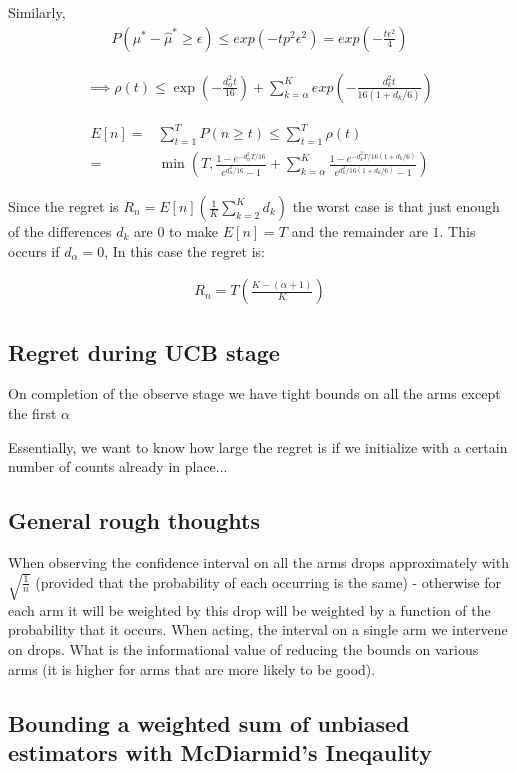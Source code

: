\documentclass{article}
\newcommand{\eqn}[1]{\begin{align}#1\end{align}}
\theoremstyle{plain}
\theoremstyle{definition}
\begin{document}
Similarly, 
\eqn {
P(\mu^* - \hat{\mu}^* \geq \epsilon) \leq exp(-tp^2\epsilon^2) = exp(-\frac{t\epsilon^2}{4})
}

\eqn {
\implies \rho(t) \leq \exp(-\frac{ d_\alpha^2 t}{16}) + \sum_{k=\alpha}^K exp(-\frac{d_k^2 t}{16(1+d_k/6)})
}


\eqn{ 
E[n] = & \sum_{t=1}^T P(n \geq t) \leq \sum_{t=1}^T \rho(t) \\
= & \min \left(T, \frac{1 - e^{-d_\alpha^2 T/16}}{e^{d_\alpha^2 /16} -1 } +  \sum_{k=\alpha}^K \frac{1 - e^{-d_k^2 T/16(1+d_k/6)}}{e^{d_k^2 /16(1+d_k/6)} -1 } \right)
}

Since the regret is $R_n = E[n]\left(\frac{1}{K}\sum_{k=2}^K d_k \right)$ the worst case is that just enough of the differences $d_k$ are $0$ to make $E[n] = T$ and the remainder are $1$. This occurs if $d_\alpha = 0$, In this case the regret is:

\eqn {
R_n = T \left(\frac{K-(\alpha+1)}{K}\right)
}


\subsection{Regret during UCB stage}

On completion of the observe stage we have tight bounds on all the arms except the first $\alpha$

Essentially, we want to know how large the regret is if we initialize with a certain number of counts already in place...


\subsection{General rough thoughts}

When observing the confidence interval on all the arms drops approximately with $\sqrt{\frac{1}{n}}$ (provided that the probability of each occurring is the same) - otherwise for each arm it will be weighted by this drop will be weighted by a function of the probability that it occurs. When acting, the interval on a single arm we intervene on drops. What is the informational value of reducing the bounds on various arms (it is higher for arms that are more likely to be good). 





\subsection{Bounding a weighted sum of unbiased estimators with McDiarmid's Ineqaulity}
\end{document}
